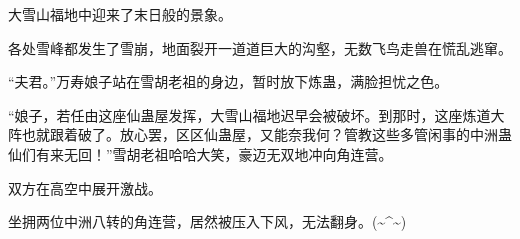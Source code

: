 \begin{this_body}
大雪山福地中迎来了末日般的景象。

各处雪峰都发生了雪崩，地面裂开一道道巨大的沟壑，无数飞鸟走兽在慌乱逃窜。

“夫君。”万寿娘子站在雪胡老祖的身边，暂时放下炼蛊，满脸担忧之色。

“娘子，若任由这座仙蛊屋发挥，大雪山福地迟早会被破坏。到那时，这座炼道大阵也就跟着破了。放心罢，区区仙蛊屋，又能奈我何？管教这些多管闲事的中洲蛊仙们有来无回！”雪胡老祖哈哈大笑，豪迈无双地冲向角连营。

双方在高空中展开激战。

坐拥两位中洲八转的角连营，居然被压入下风，无法翻身。(\~{}\^{}\~{})

\end{this_body}

